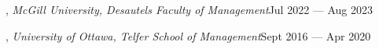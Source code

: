 , \textit{McGill University, Desautels Faculty of Management}\hfill Jul 2022 --- Aug 2023
\vspace{0.3em}

, \textit{University of Ottawa, Telfer School of Management}\hfill Sept 2016 --- Apr 2020
\vspace{0.75em}



